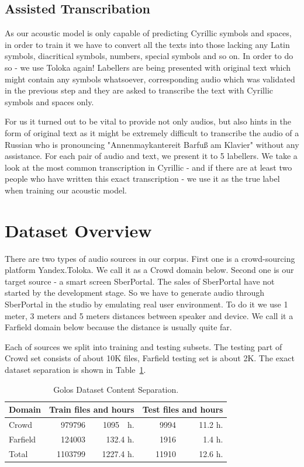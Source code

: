 \documentclass[a4paper]{article}
\begin{document}
\subsection{Assisted Transcribation}
As our acoustic model is only capable of predicting Cyrillic symbols and spaces, in order to train it we have to convert all the texts into those lacking any Latin symbols, diacritical symbols, numbers, special symbols and so on. In order to do so - we use Toloka again! Labellers are being presented with original text which might contain any symbols whatsoever, corresponding audio which was validated in the previous step and they are asked to transcribe the text with Cyrillic symbols and spaces only. 

For us it turned out to be vital to provide not only audios, but also hints in the form of original text as it might be extremely difficult to transcribe the audio of a Russian who is pronouncing "Annenmaykantereit Barfuß am Klavier"  without any assistance. For each pair of audio and text, we present it to 5 labellers. We take a look at the most common transcription in Cyrillic - and if there are at least two people who have written this exact transcription - we use it as the true label when training our acoustic model.

\section{Dataset Overview}

There are two types of audio sources in our corpus. First one is a crowd-sourcing platform Yandex.Toloka. We call it as a Crowd domain below. Second one is our target source - a smart screen SberPortal. The sales of SberPortal have not started by the development stage. So we have to generate audio through SberPortal in the studio by emulating real user environment. To do it we use 1 meter, 3 meters and 5 meters distances between speaker and device. We call it a Farfield domain below because the distance is usually quite far.

Each of sources we split into training and testing subsets. The testing part of Crowd set consists of about 10K files, Farfield testing set is about 2K. The exact dataset separation is shown in Table~\ref{tab:dataset_separation}. 

\begin{table}[th]
  \caption{Golos Dataset Content Separation.}
  \label{tab:dataset_separation}
  \centering
  \begin{tabular}{ l|r|r|r|r }
    \toprule
    \multicolumn{1}{l|}{\textbf{Domain}} & \multicolumn{2}{c|}{\textbf{Train files and hours}} & \multicolumn{2}{c}{\textbf{Test files and hours}} \\
    \midrule
    Crowd  & 979796 & 1095~~h.  & 9994 & 11.2 h. \\
    Farfield & 124003 & 132.4 h. &  1916 & 1.4 h. \\
    \bottomrule
    Total  & 1103799 & 1227.4 h. & 11910 & 12.6 h. \\
  \end{tabular}
\end{table}
\end{document}
